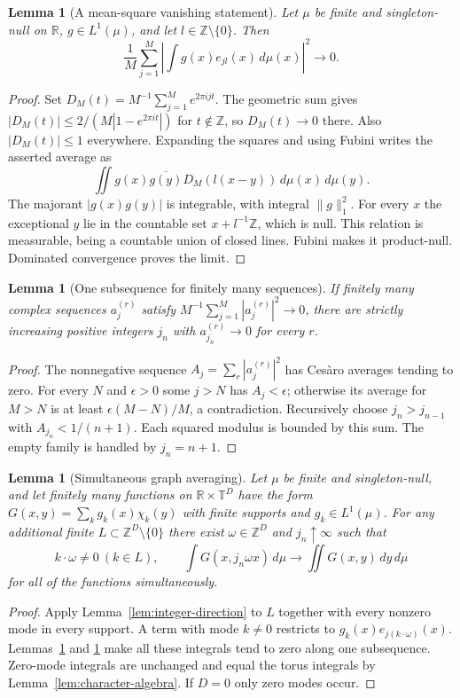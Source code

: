 \documentclass[reqno,a4paper,12pt]{amsart}
\newtheorem{lemma}[theorem]{Lemma}
\theoremstyle{definition}
\newcommand{\R}{\mathbb R}
\newcommand{\Z}{\mathbb Z}
\newcommand{\T}{\mathbb T}
\begin{document}
\begin{lemma}[A mean-square vanishing statement]\label{lem:mean-square}
Let $\mu$ be finite and singleton-null on $\R$, $g\in L^1(\mu)$,
and let $l\in\Z\setminus\{0\}$. Then
\[
 \frac1M\sum_{j=1}^M
 \left|\int g(x)e_{jl}(x)\,d\mu(x)\right|^2\longrightarrow0.
\]
\end{lemma}
\begin{proof}
Set $D_M(t)=M^{-1}\sum_{j=1}^M e^{2\pi ijt}$.
The geometric sum gives
$|D_M(t)|\le2/(M|1-e^{2\pi it}|)$ for $t\notin\Z$,
so $D_M(t)\to0$ there. Also $|D_M(t)|\le1$ everywhere.
Expanding the squares and using Fubini
writes the asserted average as
\[
 \iint g(x)\overline{g(y)}D_M(l(x-y))\,d\mu(x)\,d\mu(y).
\]
The majorant $|g(x)g(y)|$ is integrable, with integral $\|g\|_1^2$.
For every $x$ the exceptional $y$ lie in the countable set
$x+l^{-1}\Z$, which is null. This relation is measurable, being a
countable union of closed lines. Fubini makes it product-null.
Dominated convergence proves the limit.
\end{proof}

\begin{lemma}[One subsequence for finitely many sequences]\label{lem:common-subsequence}
If finitely many complex sequences $a_j^{(r)}$ satisfy
$M^{-1}\sum_{j=1}^M|a_j^{(r)}|^2\to0$, there are strictly increasing
positive integers $j_n$ with $a_{j_n}^{(r)}\to0$ for every $r$.
\end{lemma}
\begin{proof}
The nonnegative sequence $A_j=\sum_r|a_j^{(r)}|^2$ has Ces\`aro
averages tending to zero. For every $N$ and $\epsilon>0$ some $j>N$
has $A_j<\epsilon$; otherwise its average for $M>N$ is at least
$\epsilon(M-N)/M$, a contradiction.
Recursively choose $j_n>j_{n-1}$ with $A_{j_n}<1/(n+1)$.
Each squared modulus is bounded by this sum. The empty family is
handled by $j_n=n+1$.
\end{proof}

\begin{lemma}[Simultaneous graph averaging]\label{lem:graph}
Let $\mu$ be finite and singleton-null, and let finitely many functions
on $\R\times\T^D$ have the form
$G(x,y)=\sum_k g_k(x)\chi_k(y)$ with finite supports and
$g_k\in L^1(\mu)$. For any additional finite
$L\subset\Z^D\setminus\{0\}$ there exist $\omega\in\Z^D$ and
$j_n\uparrow\infty$ such that
\[
 k\cdot\omega\ne0\ (k\in L),\qquad
 \int G(x,j_n\omega x)\,d\mu\longrightarrow
 \iint G(x,y)\,dy\,d\mu
\]
for all of the functions simultaneously.
\end{lemma}
\begin{proof}
Apply Lemma~\ref{lem:integer-direction} to $L$ together with every
nonzero mode in every support. A term with mode $k\ne0$ restricts
to $g_k(x)e_{j(k\cdot\omega)}(x)$.
Lemmas~\ref{lem:mean-square} and \ref{lem:common-subsequence} make
all these integrals tend to zero along one subsequence.
Zero-mode integrals are unchanged and equal the torus integrals by
Lemma~\ref{lem:character-algebra}. If $D=0$ only zero modes occur.
\end{proof}
\end{document}
